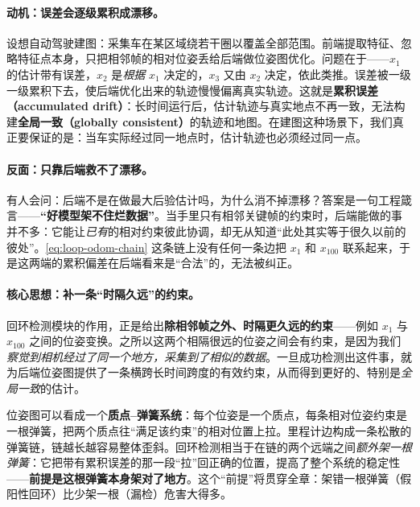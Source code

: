 \paragraph{动机：误差会逐级累积成漂移。}
设想自动驾驶建图：采集车在某区域绕若干圈以覆盖全部范围\cite{gaoxiang2019slam14}。前端提取特征、忽略特征点本身，只把相邻帧的相对位姿丢给后端做位姿图优化。问题在于——$x_1$ 的估计带有误差，$x_2$ 是\emph{根据} $x_1$ 决定的，$x_3$ 又由 $x_2$ 决定，依此类推。误差被一级一级累积下去，使后端优化出来的轨迹慢慢偏离真实轨迹。这就是\textbf{累积误差（accumulated drift）}：长时间运行后，估计轨迹与真实地点不再一致，无法构建\textbf{全局一致（globally consistent）}的轨迹和地图。在建图这种场景下，我们真正要保证的是：当车实际经过同一地点时，估计轨迹也必须经过同一点。

\paragraph{反面：只靠后端救不了漂移。}
有人会问：后端不是在做最大后验估计吗，为什么消不掉漂移？答案是一句工程箴言——\textbf{“好模型架不住烂数据”}。当手里只有相邻关键帧的约束时，后端能做的事并不多：它能让\emph{已有}的相对约束彼此协调，却无从知道“此处其实等于很久以前的彼处”。\cref{eq:loop-odom-chain} 这条链上没有任何一条边把 $x_1$ 和 $x_{100}$ 联系起来，于是这两端的累积偏差在后端看来是“合法”的，无法被纠正。

\paragraph{核心思想：补一条“时隔久远”的约束。}
回环检测模块的作用，正是给出\textbf{除相邻帧之外、时隔更久远的约束}\cite{gaoxiang2019slam14}——例如 $x_1$ 与 $x_{100}$ 之间的位姿变换。之所以这两个相隔很远的位姿之间会有约束，是因为我们\emph{察觉到相机经过了同一个地方，采集到了相似的数据}。一旦成功检测出这件事，就为后端位姿图提供了一条横跨长时间跨度的有效约束，从而得到更好的、特别是\emph{全局一致}的估计。

\begin{insight}[回环边 = 给位姿图加一根弹簧]\label{ins:loop-spring}
位姿图可以看成一个\textbf{质点--弹簧系统}：每个位姿是一个质点，每条相对位姿约束是一根弹簧，把两个质点往“满足该约束”的相对位置上拉\cite{gaoxiang2019slam14}。里程计边构成一条松散的弹簧链，链越长越容易整体歪斜。回环检测相当于在链的两个远端之间\emph{额外架一根弹簧}：它把带有累积误差的那一段“拉”回正确的位置，提高了整个系统的稳定性——\textbf{前提是这根弹簧本身架对了地方}。这个“前提”将贯穿全章：架错一根弹簧（假阳性回环）比少架一根（漏检）危害大得多。
\end{insight}

